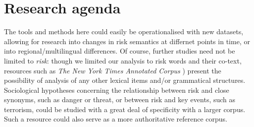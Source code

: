 
\section{Research agenda}

The tools and methods here could easily be operationalised with new datasets, allowing for research into changes in risk semantics at differnet points in time, or into regional\slash multilingual differences. Of course, further studies need not be limited to \emph{risk}: though we limited our analysis to risk words and their co-text, resources such as \emph{The New York Times Annotated Corpus} \cite{sandhaus_new_2008}) present the possibility of analysis of any other lexical items and\slash or grammatical structures. Sociological hypotheses concerning the relationship between risk and close synonyms, such as danger or threat, or between risk and key events, such as terrorism, could be studied with a great deal of specificity with a larger corpus. Such a resource could also serve as a more authoritative reference corpus.


